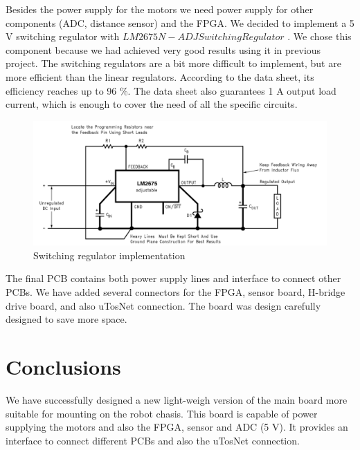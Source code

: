 Besides the power supply for the motors we need power supply for other components (ADC, distance sensor) and the FPGA. We decided to implement a 5 V switching regulator with $LM2675N-ADJ Switching Regulator$ \cite{switching_regulator}. We chose this component because we had achieved very good results using it in previous project. The switching regulators are a bit more difficult to implement, but are more efficient than the linear regulators. According to the data sheet, its efficiency reaches up to 96 \%. The data sheet also guarantees 1 A output load current, which is enough to cover the need of all the specific circuits. 

\begin{figure}[!ht]
	\centering
	\includegraphics[width=1.0\textwidth]{figures/switching_regulator}
	\caption{Switching regulator implementation}
	\label{fig:linear_reg}
\end{figure}

The final PCB contains both power supply lines and interface to connect other PCBs. We have added several connectors for the FPGA, sensor board, H-bridge drive board, and also uTosNet connection. The board was design carefully designed to save more space. 
 
\section{Conclusions}
We have successfully designed a new light-weigh version of the main board more suitable for mounting on the robot chasis. This board is capable of power supplying the motors and also the FPGA, sensor and ADC (5 V). It provides an interface to connect different PCBs and also the uTosNet connection. 